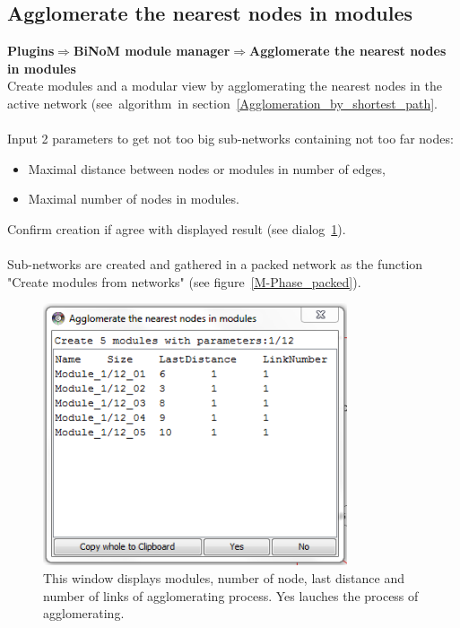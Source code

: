 \subsection{Agglomerate the nearest nodes in modules}
\textbf{Plugins$\Rightarrow$BiNoM module manager$\Rightarrow$Agglomerate the nearest nodes in modules}\\
Create modules and a modular view by agglomerating the nearest nodes in the active network (see~algorithm~in section~\ref{Agglomeration_by_shortest_path}.\\\\
Input 2 parameters to get not too big sub-networks containing not too far nodes:
\begin{itemize}
\item Maximal distance between nodes or modules in number of edges,
\item Maximal number of nodes in modules.
\end{itemize}
Confirm creation if agree with displayed result (see dialog~\ref{Agglomerate_in_modules_dialog}).\\\\
Sub-networks are created and gathered in a packed network as the function "Create modules from networks" (see figure~\ref{M-Phase_packed}).
\begin{figure}
\centering
\includegraphics[width=0.8\textwidth]{graphics/Agglomerate_in_modules_dialog}
\caption{This window displays modules, number of node, last distance and number of links of agglomerating process. Yes lauches the process of agglomerating.}
\label{Agglomerate_in_modules_dialog}
\end{figure}
